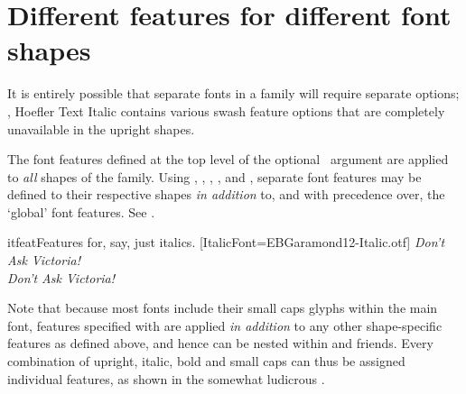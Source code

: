 \section{Different features for different font shapes}
\label{sec:bfit-feat}


It is entirely possible that separate fonts in a family will require
separate options; \eg, Hoefler Text Italic contains various swash
feature options that are completely unavailable in the upright shapes.

The font features defined at the top level of the optional \cmd\fontspec\
argument are applied to \emph{all} shapes of the family.
Using , , ,
, and ,
separate font features may be defined to their respective shapes
\emph{in addition} to, and with precedence over, the `global' font features.
See \exref{itfeat}.

\begin{Xexample}{itfeat}{Features for, say, just italics.}
%
  [ItalicFont=EBGaramond12-Italic.otf]
\itshape Don’t Ask Victoria! \\
Don’t Ask Victoria! \\
\end{Xexample}

Note that because most fonts include their small caps glyphs
within the main font, features specified with  are applied \emph{in addition} to
any other shape-specific features as defined above, and hence \feat{SmallCapsFeatures}
can be nested within \feat{ItalicFeatures} and friends. Every combination
of upright, italic, bold and small caps can thus be assigned individual
features, as shown in the somewhat ludicrous \exref{scfeat}.

